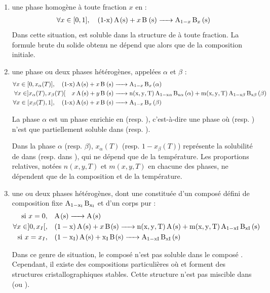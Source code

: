 \documentclass[a4paper,16pt]{book}
\begin{document}
\begin{enumerate}
\item  une phase homogène à toute fraction $x$ en  :
\begin{align*}
\forall x \in [0,1], \quad \ce{(1-x) A(s) + x B (s) -> A_{1-x} B_x (s)}
\end{align*}
Dans cette situation,  est soluble dans la structure de  à toute fraction. La formule brute du solide obtenu ne dépend que alors que de la composition initiale.

\item une phase ou deux phases hétérogènes, appelées $\alpha$ et $\beta$ : 
\begin{align*}
\forall x \in [0, x_\alpha (T)], \quad \ce{(1-x) A(s) + x B (s) & -> A_{1-x} B_{x} (\alpha)} \\
\forall x \in ]x_\alpha (T), x_\beta (T)[ \quad \ce{x A(s) + y B (s) & -> n(x,y,T) A_{1-x\alpha} B_{x\alpha} (\alpha) + m(x,y,T) A_{1-x\beta} B_{x\beta} (\beta)} \\
\forall x \in [x_\beta (T), 1], \quad \ce{(1-x) A(s) + x B (s) & -> A_{1-x} B_{x}  (\beta)}
\end{align*}

La phase $\alpha$ est un phase enrichie en  (resp. ), c'est-à-dire une phase où  (resp. ) n'est que partiellement soluble dans  (resp. ).

Dans la phase $\alpha$ (resp. $\beta$), $x_\alpha (T)$ (resp. $1 - x_\beta (T)$) représente la solubilité de  dans  (resp.  dans ), qui ne dépend que de la température. Les proportions relatives, notées $n(x,y,T)$ et $m(x,y,T)$ en chacune des phases, ne dépendent que de la composition et de la température.

\item une ou deux phases hétérogènes, dont une constituée d'un composé défini de composition fixe $\ce{A_{1 - x_I} B_{x_I}}$ et d'un corps pur :
\begin{align*}
\text{si } x = 0, \quad &\ce{A(s) -> A(s)} \\
\forall x \in ]0, x_I[, \quad &\ce{(1 - x) A(s) + x B(s) -> n(x,y,T) A(s) + m(x,y,T) A_{1-xI} B_{xI} (s)} \\
\text{si } x = x_I, \quad &\ce{(1 - x_I) A(s) + x_I B(s) -> A_{1-xI} B_{xI} (s)}
\end{align*}

Dans ce genre de situation, le composé  n'est pas soluble dans le composé . Cependant, il existe des compositions particulières où  et  forment des structures cristallographiques stables. Cette structure n'est pas miscible dans  (ou ). 


\end{enumerate}
\end{document}
